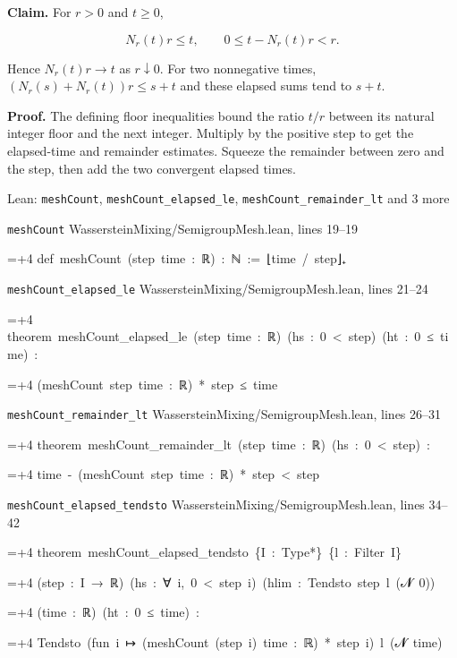 \documentclass[11pt,a4paper]{report}
\newlength{\leancharwidth}
\newenvironment{leancode}{\par\smallskip\begingroup\ttfamily\footnotesize\raggedright
  \settowidth{\leancharwidth}{M}\setlength{\parskip}{0pt}\setlength{\parindent}{0pt}
  \frenchspacing}{\par\endgroup\smallskip}
\newcommand{\leanline}[2]{\hangindent=\dimexpr#1\leancharwidth+4\leancharwidth\relax
  \hangafter=1\noindent\hspace*{#1\leancharwidth}#2\par}
\newcommand{\leansource}[1]{\par{\footnotesize\color{leanmuted}#1}\par}
\begin{document}
\textbf{Claim.} For \(r>0\) and \(t\ge0\),

\[N_r(t)r\le t,\qquad 0\le t-N_r(t)r<r.\]

Hence \(N_r(t)r\to t\) as \(r\downarrow0\). For two nonnegative times, \((N_r(s)+N_r(t))r\le s+t\) and these elapsed sums tend to \(s+t\).



\textbf{Proof.} The defining floor inequalities bound the ratio \(t/r\) between its natural integer floor and the next integer. Multiply by the positive step to get the elapsed-time and remainder estimates. Squeeze the remainder between zero and the step, then add the two convergent elapsed times.

\begin{leanbox}{Lean: \texttt{meshCount}, \texttt{meshCount\_\allowbreak{}elapsed\_\allowbreak{}le}, \texttt{meshCount\_\allowbreak{}remainder\_\allowbreak{}lt} and 3 more}
\leansource{\texttt{meshCount} \quad WassersteinMixing/\allowbreak{}SemigroupMesh.lean, lines 19–19}
\begin{leancode}
\leanline{0}{def\ meshCount\ (step\ time\ :\ ℝ)\ :\ ℕ\ :=\ ⌊time\ /\ step⌋₊}
\end{leancode}
\leansource{\texttt{meshCount\_\allowbreak{}elapsed\_\allowbreak{}le} \quad WassersteinMixing/\allowbreak{}SemigroupMesh.lean, lines 21–24}
\begin{leancode}
\leanline{0}{theorem\ meshCount\_elapsed\_le\ (step\ time\ :\ ℝ)\ (hs\ :\ 0\ <\ step)\ (ht\ :\ 0\ ≤\ time)\ :}
\leanline{4}{(meshCount\ step\ time\ :\ ℝ)\ *\ step\ ≤\ time}
\end{leancode}
\leansource{\texttt{meshCount\_\allowbreak{}remainder\_\allowbreak{}lt} \quad WassersteinMixing/\allowbreak{}SemigroupMesh.lean, lines 26–31}
\begin{leancode}
\leanline{0}{theorem\ meshCount\_remainder\_lt\ (step\ time\ :\ ℝ)\ (hs\ :\ 0\ <\ step)\ :}
\leanline{4}{time\ -\ (meshCount\ step\ time\ :\ ℝ)\ *\ step\ <\ step}
\end{leancode}
\leansource{\texttt{meshCount\_\allowbreak{}elapsed\_\allowbreak{}tendsto} \quad WassersteinMixing/\allowbreak{}SemigroupMesh.lean, lines 34–42}
\begin{leancode}
\leanline{0}{theorem\ meshCount\_elapsed\_tendsto\ \{I\ :\ Type*\}\ \{l\ :\ Filter\ I\}}
\leanline{4}{(step\ :\ I\ →\ ℝ)\ (hs\ :\ ∀\ i,\ 0\ <\ step\ i)\ (hlim\ :\ Tendsto\ step\ l\ ({\leanfallback 𝓝}\ 0))}
\leanline{4}{(time\ :\ ℝ)\ (ht\ :\ 0\ ≤\ time)\ :}
\leanline{4}{Tendsto\ (fun\ i\ ↦\ (meshCount\ (step\ i)\ time\ :\ ℝ)\ *\ step\ i)\ l\ ({\leanfallback 𝓝}\ time)}

\end{leancode}
\end{leanbox}
\end{document}
